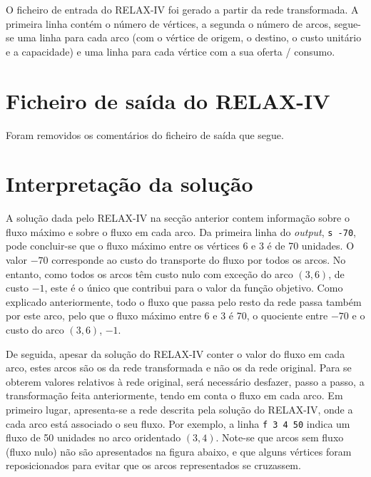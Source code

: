 \documentclass[12pt, a4paper, titlepage]{article}
\begin{document}
O ficheiro de entrada do RELAX-IV foi gerado a partir da rede transformada. A primeira linha contém
o número de vértices, a segunda o número de arcos, segue-se uma linha para cada arco (com o vértice
de origem, o destino, o custo unitário e a capacidade) e uma linha para cada vértice com a sua
oferta / consumo. \\



\section{Ficheiro de saída do RELAX-IV}

Foram removidos os comentários do ficheiro de saída que segue. \\



\section{Interpretação da solução}

A solução dada pelo RELAX-IV na secção anterior contem informação sobre o fluxo máximo e sobre o
fluxo em cada arco. Da primeira linha do \emph{output}, \texttt{s -70}, pode concluir-se que o fluxo
máximo entre os vértices 6 e 3 é de 70 unidades. O valor $-70$ corresponde ao custo do transporte
do fluxo por todos os arcos. No entanto, como todos os arcos têm custo nulo com exceção do arco
$(3, 6)$, de custo $-1$, este é o único que contribui para o valor da função objetivo. Como
explicado anteriormente, todo o fluxo que passa pelo resto da rede passa também por este arco, pelo
que o fluxo máximo entre 6 e 3 é 70, o quociente entre $-70$ e o custo do arco $(3, 6)$, $-1$.

De seguida, apesar da solução do RELAX-IV conter o valor do fluxo em cada arco, estes arcos são os
da rede transformada e não os da rede original. Para se obterem valores relativos à rede original,
será necessário desfazer, passo a passo, a transformação feita anteriormente, tendo em conta o fluxo
em cada arco. Em primeiro lugar, apresenta-se a rede descrita pela solução do RELAX-IV, onde a cada
arco está associado o seu fluxo. Por exemplo, a linha \texttt{f 3 4 50} indica um fluxo de 50
unidades no arco oridentado $(3, 4)$. Note-se que arcos sem fluxo (fluxo nulo) não são apresentados
na figura abaixo, e que alguns vértices foram reposicionados para evitar que os arcos representados
se cruzassem.
\end{document}

